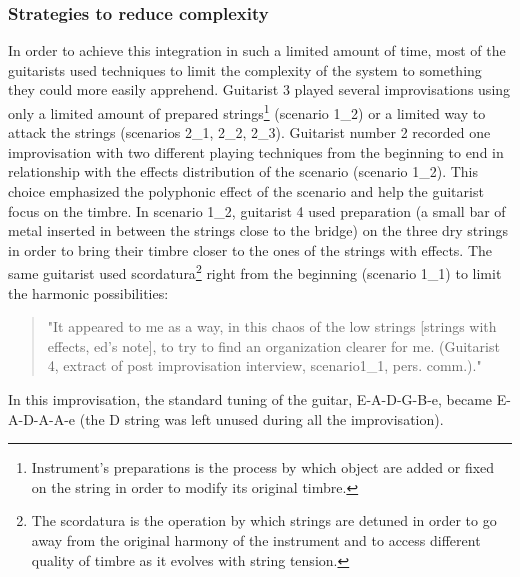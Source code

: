 \documentclass{article}
\begin{document}
\subsubsection{Strategies to reduce complexity}
In order to achieve this integration in such a limited amount of time, most of the guitarists used techniques to limit the complexity of the system to something they could more easily apprehend. Guitarist 3 played several improvisations using only a limited amount of prepared strings\footnote{Instrument's preparations is the process by which object are added or fixed on the string in order to modify its original timbre.} (scenario 1\_2) or a limited way to attack the strings (scenarios 2\_1, 2\_2, 2\_3). Guitarist number 2 recorded one improvisation with two different playing techniques from the beginning to end in relationship with the effects distribution of the scenario (scenario 1\_2). This choice emphasized the polyphonic effect of the scenario and help the guitarist focus on the timbre. In scenario 1\_2, guitarist 4 used preparation (a small bar of metal inserted in between the strings close to the bridge) on the three dry strings in order to bring their timbre closer to the ones of the strings with effects. The same guitarist used scordatura\footnote{The scordatura is the operation by which strings are detuned in order to go away from the original harmony of the instrument and to access different quality of timbre as it evolves with string tension.} right from the beginning (scenario 1\_1) to limit the harmonic possibilities:
    \begin{quote}
        "It appeared to me as a way, in this chaos of the low strings [strings with effects, ed's note], to try to find an organization clearer for me. (Guitarist 4, extract of post improvisation interview, scenario1\_1, pers. comm.)."
    \end{quote}
In this improvisation, the standard tuning of the guitar, E-A-D-G-B-e, became E-A-D-A-A-e (the D string was left unused during all the improvisation). 
\end{document}
